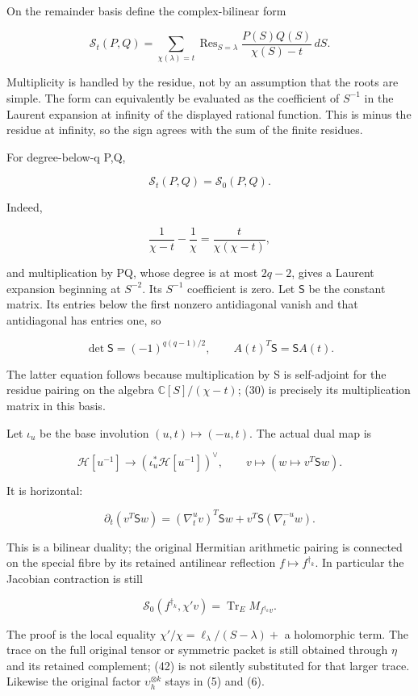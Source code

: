 On the remainder basis define the complex-bilinear form

\[
\mathscr S_t(P,Q)=\sum_{\chi(\lambda)=t}
\operatorname{Res}_{S=\lambda}\frac{P(S)Q(S)}{\chi(S)-t}\,dS.
\tag{37}
\]

Multiplicity is handled by the residue, not by an assumption that the roots are simple. The form can equivalently be evaluated as the coefficient of \(S^{-1}\) in the Laurent expansion at infinity of the displayed rational function. This is minus the residue at infinity, so the sign agrees with the sum of the finite residues.

For degree-below-q P,Q,

\[
\boxed{\mathscr S_t(P,Q)=\mathscr S_0(P,Q).}
\tag{38}
\]

Indeed,

\[
\frac1{\chi-t}-\frac1\chi=\frac{t}{\chi(\chi-t)},
\]

and multiplication by PQ, whose degree is at most \(2q-2\), gives a Laurent expansion beginning at \(S^{-2}\). Its \(S^{-1}\) coefficient is zero. Let \(\mathsf S\) be the constant matrix. Its entries below the first nonzero antidiagonal vanish and that antidiagonal has entries one, so

\[
\det\mathsf S=(-1)^{q(q-1)/2},\qquad
\boxed{A(t)^T\mathsf S=\mathsf S A(t).}
\tag{39}
\]

The latter equation follows because multiplication by S is self-adjoint for the residue pairing on the algebra \(\mathbb C[S]/(\chi-t)\); (30) is precisely its multiplication matrix in this basis.

Let \(\iota_u\) be the base involution \((u,t)\mapsto(-u,t)\). The actual dual map is

\[
\boxed{\mathcal H[u^{-1}]\longrightarrow
(\iota_u^*\mathcal H[u^{-1}])^\vee,
\qquad v\longmapsto(w\mapsto v^T\mathsf S w).}
\tag{40}
\]

It is horizontal:

\[
\partial_t(v^T\mathsf S w)
=(\nabla_t^{u}v)^T\mathsf S w
+v^T\mathsf S(\nabla_t^{-u}w).
\tag{41}
\]

This is a bilinear duality; the original Hermitian arithmetic pairing is connected on the special fibre by its retained antilinear reflection \(f\mapsto f^{\dagger_k}\). In particular the Jacobian contraction is still

\[
\boxed{\mathscr S_0(f^{\dagger_k},\chi'v)
=\operatorname{Tr}_{E}M_{f^{\dagger_k}v}.}
\tag{42}
\]

The proof is the local equality \(\chi'/\chi=\ell_\lambda/(S-\lambda)+\) a holomorphic term. The trace on the full original tensor or symmetric packet is still obtained through \(\eta\) and its retained complement; (42) is not silently substituted for that larger trace. Likewise the original factor \(\upsilon_h^{\otimes k}\) stays in (5) and (6).

